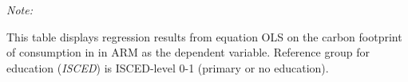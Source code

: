 \begin{table}[htbp!]
\begin{adjustbox}{width = 1\textwidth, max height = 0.95\textheight, center}
\begin{threeparttable}[b]
         \begin{tablenotes}\item \medskip \textit{Note:}
            \item This table displays regression results from equation OLS on the carbon footprint of consumption in  in ARM as the dependent variable.  Reference group for education (\textit{ISCED}) is ISCED-level 0-1 (primary or no education).
         \end{tablenotes}
      \end{threeparttable}
   \end{adjustbox}
\end{table}


